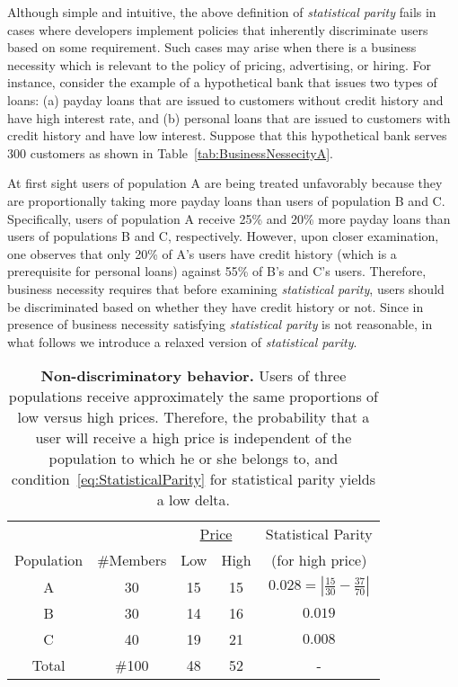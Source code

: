Although simple and intuitive, the above definition of {\em statistical parity}
fails in cases where developers implement policies that inherently discriminate
users based on some requirement. Such cases may arise when there is a
business necessity which is relevant to the policy of pricing, advertising,
or hiring. For instance, consider the example of a hypothetical bank that issues
two types of loans: (a) payday loans that are issued to customers without credit
history and have high interest rate, and (b) personal loans that are issued to
customers with credit history and have low interest. Suppose that this
hypothetical bank serves 300 customers as shown in
Table~\ref{tab:BusinessNessecityA}.

At first sight users of population A are being treated unfavorably because they
are proportionally taking more payday loans than users of population B and C.
Specifically, users of population A
receive 25\% and 20\% more payday loans than users of populations B and C,
respectively. However, upon closer examination, one observes that only 20\% of A’s
users have credit history (which is a prerequisite for personal loans) against
55\% of B’s and C’s users. Therefore, business necessity requires that before
examining {\em statistical parity}, users should be discriminated based on whether
they have credit history or not. Since in presence of business necessity
satisfying {\em statistical parity} is not reasonable, in what follows we introduce
a relaxed version of {\em statistical parity}.

\begin{table}[t]
{\scriptsize
  \renewcommand{\arraystretch}{1.5}
  \begin{tabular}{ c | c | c  c | c }
    & & \multicolumn{2}{|c|}{\underline{Price}} &  Statistical Parity\\
    Population & \#Members & Low & High & (for high price) \\
    \hline
    A & 30 &  15 & 15 & $0.028 = | \frac{15}{30} - \frac{37}{70}|$ \\
    B & 30 &  14 & 16 & $0.019$ \\
    C & 40 &  19 & 21 & $0.008$ \\
    \hline
    Total & \#100 & 48 & 52 & - \\
  \end{tabular}
  \caption{{\bf Non-discriminatory behavior.} Users of three populations receive approximately
  the same proportions of low versus high prices. Therefore, the probability that a user
  will receive a high price is independent of the population to which he or she belongs to,
  and condition~\ref{eq:StatisticalParity} for statistical parity yields a low delta.}
  \label{tab:NonDiscriminationExample}
}
\end{table}



